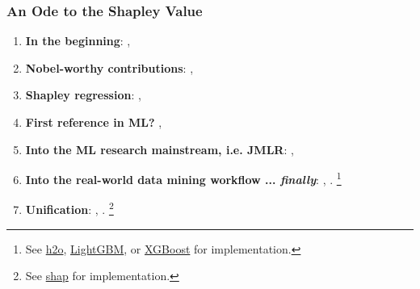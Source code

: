 \documentclass[11pt,
               aspectratio=169,
               hyperref={colorlinks}
               ]{beamer}
\begin{document}
	\begin{frame}
		
		\frametitle{An Ode to the Shapley Value}		
		
		\begin{enumerate}\footnotesize
				
			\item \textbf{In the beginning}: , 
			\item \textbf{Nobel-worthy contributions}: , 
			\item \textbf{Shapley regression}: , 
			\item \textbf{First reference in ML?} ,  	
			\item \textbf{Into the ML research mainstream, i.e. JMLR}: , 
			\item \textbf{Into the real-world data mining workflow ... \textit{finally}}: , . \footnote{\tiny{See \href{https://github.com/h2oai/h2o-3}{h2o}, \href{https://github.com/microsoft/LightGBM}{LightGBM}, or \href{https://github.com/dmlc/xgboost}{XGBoost} for implementation.}}
			\item \textbf{Unification}: , . \footnote{\tiny{See \href{https://github.com/slundberg/shap}{shap} for implementation.}}
				
		\end{enumerate}
			
	\end{frame}
	
\end{document}
